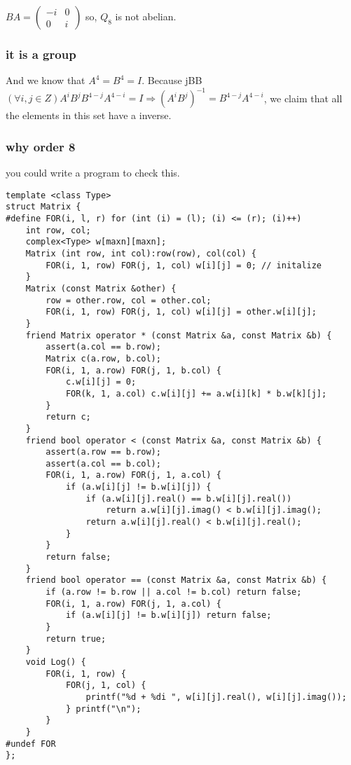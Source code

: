 \documentclass[11pt]{article}
\begin{document}
\(BA = \left(\begin{array}{cc} -i & 0 \\ 0 & i \end{array} \right)\)
so, \(Q_8\) is not abelian.
\subsubsection{it is a group}
\label{sec:orge4cdea0}
And we know that \(A^4 = B^4 = I\).
Because jBB\((\forall i,j \in Z) A^iB^jB^{4-j}A^{4-i} = I \Rightarrow (A^iB^j)^{-1} = B^{4-j}A^{4-i}\), we claim that all the elements
in this set have a inverse.
\subsubsection{why order 8}
\label{sec:org74c66e6}
you could write a program to check this.
\begin{verbatim}
template <class Type>
struct Matrix {
#define FOR(i, l, r) for (int (i) = (l); (i) <= (r); (i)++)
    int row, col;
    complex<Type> w[maxn][maxn];
    Matrix (int row, int col):row(row), col(col) {
        FOR(i, 1, row) FOR(j, 1, col) w[i][j] = 0; // initalize
    }
    Matrix (const Matrix &other) {
        row = other.row, col = other.col;
        FOR(i, 1, row) FOR(j, 1, col) w[i][j] = other.w[i][j];
    }
    friend Matrix operator * (const Matrix &a, const Matrix &b) {
        assert(a.col == b.row);
        Matrix c(a.row, b.col);
        FOR(i, 1, a.row) FOR(j, 1, b.col) {
            c.w[i][j] = 0;
            FOR(k, 1, a.col) c.w[i][j] += a.w[i][k] * b.w[k][j];
        }
        return c;
    }
    friend bool operator < (const Matrix &a, const Matrix &b) {
        assert(a.row == b.row);
        assert(a.col == b.col);
        FOR(i, 1, a.row) FOR(j, 1, a.col) {
            if (a.w[i][j] != b.w[i][j]) {
                if (a.w[i][j].real() == b.w[i][j].real()) 
                    return a.w[i][j].imag() < b.w[i][j].imag();
                return a.w[i][j].real() < b.w[i][j].real();
            }
        }
        return false;
    }
    friend bool operator == (const Matrix &a, const Matrix &b) {
        if (a.row != b.row || a.col != b.col) return false;
        FOR(i, 1, a.row) FOR(j, 1, a.col) {
            if (a.w[i][j] != b.w[i][j]) return false;
        }
        return true;
    }
    void Log() {
        FOR(i, 1, row) {
            FOR(j, 1, col) {
                printf("%d + %di ", w[i][j].real(), w[i][j].imag());
            } printf("\n");
        }
    }
#undef FOR
};
\end{verbatim}
\end{document}
